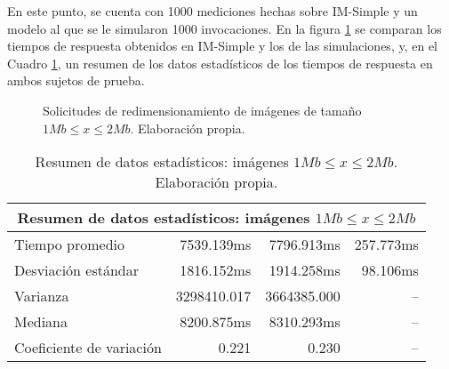 En este punto, se cuenta con 1000 mediciones hechas sobre IM-Simple y un modelo al que se le simularon 1000 invocaciones. En la figura \ref{fig:comparacion-imsimple-palladio-2mb} se comparan los tiempos de respuesta obtenidos en IM-Simple y los de las simulaciones, y, en el Cuadro \ref{table:datos-estadisticos-hasta-2mb}, un resumen de los datos estadísticos de los tiempos de respuesta en ambos sujetos de prueba.

\begin{figure}[h]
\hspace{-1cm}
\caption[\hspace{0.2cm} Solicitudes de redimensionamiento de imágenes de tamaño $1Mb \leq x \leq 2Mb$]{Solicitudes de redimensionamiento de imágenes de tamaño $1Mb \leq x \leq 2Mb$. Elaboración propia.}
\label{fig:comparacion-imsimple-palladio-2mb}
\end{figure}

\begin{table}
    \centering
    \begin{tabular}{l|r|r|r}
        \toprule[1.5pt]
         \multicolumn{4}{c}{\textbf{Resumen de datos estadísticos: imágenes $1Mb \leq x \leq 2Mb$}} \\
         \midrule 
        Tiempo promedio  & 7539.139ms & 7796.913ms & 257.773ms\\
        Desviación estándar & 1816.152ms & 1914.258ms & 98.106ms \\
        Varianza & 3298410.017 & 3664385.000 & -- \\
        Mediana & 8200.875ms & 8310.293ms & -- \\
        Coeficiente de variación & 0.221 & 0.230 & -- \\                        
        \bottomrule[1.5pt]
    \end{tabular}
    \caption[Resumen de datos estadísticos: imágenes $1Mb \leq x \leq 2Mb$]{Resumen de datos estadísticos: imágenes $1Mb \leq x \leq 2Mb$. Elaboración propia.}
    \label{table:datos-estadisticos-hasta-2mb}
\end{table}

